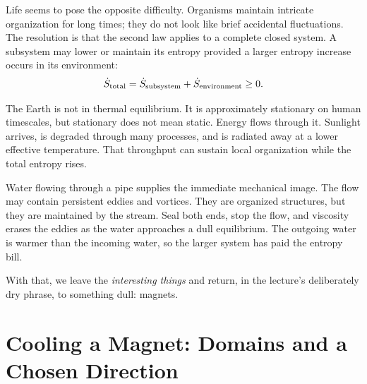Life seems to pose the opposite difficulty.  Organisms maintain intricate
organization for long times; they do not look like brief accidental
fluctuations.  The resolution is that the second law applies to a complete
closed system.  A subsystem may lower or maintain its entropy provided a
larger entropy increase occurs in its environment:
\begin{equation}
 \dot S_{\rm total}
 =\dot S_{\rm subsystem}+\dot S_{\rm environment}\geq 0.
 \label{eq:sm8-open-system-second-law}
\end{equation}

The Earth is not in thermal equilibrium.  It is approximately stationary on
human timescales, but stationary does not mean static.  Energy flows through
it.  Sunlight arrives, is degraded through many processes, and is radiated
away at a lower effective temperature.  That throughput can sustain local
organization while the total entropy rises.

Water flowing through a pipe supplies the immediate mechanical image.  The
flow may contain persistent eddies and vortices.  They are organized
structures, but they are maintained by the stream.  Seal both ends, stop the
flow, and viscosity erases the eddies as the water approaches a dull
equilibrium.  The outgoing water is warmer than the incoming water, so the
larger system has paid the entropy bill.

\begin{classroomqa}
\end{classroomqa}

With that, we leave the \emph{interesting things} and return, in the
lecture's deliberately dry phrase, to something dull: magnets.

\section{Cooling a Magnet: Domains and a Chosen Direction}

